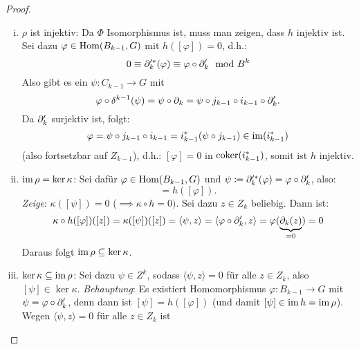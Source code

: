 \begin{proof}
  \begin{enumerate}[(i)]
    \item
      $\rho$ ist injektiv:
      Da $\Phi$ Isomorphismus ist, muss man zeigen, dass $h$ injektiv ist.
      Sei dazu $\varphi \in \mathrm{Hom}(B_{k-1},G)$ mit $h([\varphi]) = 0$, d.h.:
      \begin{equation*}
        0 \equiv \partial_{k}'^*(\varphi) \equiv \varphi \circ \partial_k' \mod B^k
      \end{equation*}
      Also gibt es ein $\psi \colon C_{k-1} \to G$ mit
      \begin{equation*}
        \varphi \circ \delta^{k-1}(\psi) = \psi \circ \partial_k = \psi \circ j_{k-1} \circ i_{k-1} \circ \partial_k'.
      \end{equation*}
      Da $\partial_k'$ surjektiv ist, folgt:
      \begin{equation*}
        \varphi = \psi \circ j_{k-1} \circ i_{k-1} = i_{k-1}^*(\psi \circ j_{k-1}) \in \operatorname{im}(i_{k-1}^*)
      \end{equation*}
      (also fortsetzbar auf $Z_{k-1}$), d.h.: $[\varphi] = 0$ in $\operatorname{coker}(i_{k-1}^*)$, somit ist $h$ injektiv.
    \item
      $\operatorname{im} \rho = \ker \kappa$:
      Sei dafür $\varphi \in \mathrm{Hom}(B_{k-1},G)$ und $\psi \coloneqq \partial_{k}'^* (\varphi) = \varphi \circ \partial_k'$, also:
      \begin{equation*}
        [\psi] = h([\varphi]).
      \end{equation*}
      \emph{Zeige}: $\kappa([\psi]) = 0$ ($\implies \kappa \circ h = 0)$.
      Sei dazu $z \in Z_k$ beliebig.
      Dann ist:
      \begin{equation*}
        \kappa \circ h ([\varphi])([z]) = \kappa([\psi])([z]) = \langle \psi, z \rangle = \langle \varphi \circ \partial_k', z \rangle = \varphi(\underbrace{\partial_k(z)}_{= 0}) = 0
      \end{equation*}
      Daraus folgt $\operatorname{im} \rho \subseteq \ker \kappa$.
    \item
      $\ker \kappa \subseteq \operatorname{im} \rho$:
      Sei dazu $\psi \in Z^k$, sodass $\langle \psi, z \rangle = 0$ für alle $z \in Z_k$, also $[\psi] \in \ker \kappa$.
      \emph{Behauptung}: Es existiert Homomorphismus $\varphi \colon B_{k-1} \to G$  mit $\psi = \varphi \circ \partial_k'$, denn dann ist $[\psi] = h([\varphi])$ (und damit $[\psi] \in \operatorname{im} h = \operatorname{im} \rho$).
      Wegen $\langle \psi, z \rangle = 0$ für alle $z \in Z_k$ ist
      \begin{equation*}

\end{equation*}
\end{enumerate}
\end{proof}
